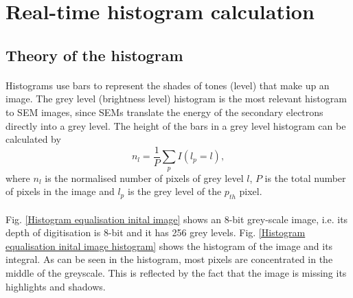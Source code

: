 \documentclass[12pt, twocolumn]{report}
\begin{document}
\section{Real-time histogram calculation}
\subsection{Theory of the histogram}
\paragraph{}
Histograms use bars to represent the shades of tones (level) that make up an image. The grey level (brightness level) histogram is the most relevant histogram to SEM images, since SEMs translate the energy of the secondary electrons directly into a grey level. The height of the bars in a grey level histogram can be calculated by
\begin{equation}
    n_l = \frac{1}{P} \sum_{p} I(l_p=l),
\end{equation}
where $n_l$ is the normalised number of pixels of grey level $l$, $P$ is the total number of pixels in the image and $l_p$ is the grey level of the $p_{th}$ pixel. 

\paragraph{}
Fig. \ref{Histogram equalisation inital image} shows an 8-bit grey-scale image, i.e. its depth of digitisation is 8-bit and it has 256 grey levels. Fig. \ref{Histogram equalisation inital image histogram} shows the histogram of the image and its integral. As can be seen in the histogram, most pixels are concentrated in the middle of the greyscale. This is reflected by the fact that the image is missing its highlights and shadows.
\end{document}
